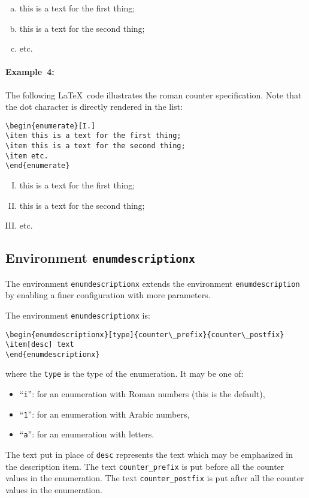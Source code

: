 \documentclass[book,taskpackage,specpackage,codepackage]{upmethodology-document}
\begin{document}
\begin{enumerate}[(a)]
\item this is a text for the first thing;
\item this is a text for the second thing;
\item etc.
\end{enumerate}

\paragraph{Example~4:} The following \LaTeX~code illustrates the roman counter specification. Note that the dot character is directly rendered in the list:
\begin{verbatim}
\begin{enumerate}[I.]
\item this is a text for the first thing;
\item this is a text for the second thing;
\item etc.
\end{enumerate}
\end{verbatim}

\begin{enumerate}[I.]
\item this is a text for the first thing;
\item this is a text for the second thing;
\item etc.
\end{enumerate}

\subsection{Environment \texttt{enumdescriptionx}}

The environment \texttt{enumdescriptionx} extends the environment \texttt{enumdescription} by enabling a finer configuration with more parameters.


The environment \texttt{enumdescriptionx} is:
\begin{verbatim}
\begin{enumdescriptionx}[type]{counter\_prefix}{counter\_postfix}
\item[desc] text
\end{enumdescriptionx}
\end{verbatim}
where the \texttt{type} is the type of the enumeration. It may be one of:
\begin{itemize}
\item ``\texttt{i}'': for an enumeration with Roman numbers (this is the default),
\item ``\texttt{1}'': for an enumeration with Arabic numbers,
\item ``\texttt{a}'': for an enumeration with letters.
\end{itemize}
The text put in place of \texttt{desc} represents the text which may be emphasized in the description item.
The text \texttt{counter\_prefix} is put before all the counter values in the enumeration.
The text \texttt{counter\_postfix} is put after all the counter values in the enumeration.
\end{document}
